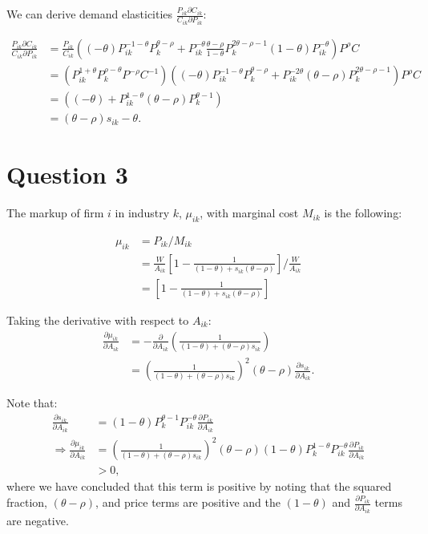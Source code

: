\documentclass[11pt]{article} %
\begin{document}
We can derive demand elasticities $\frac{P_{ik}\partial C_{ik}}{C_{ik}\partial P_{ik}}$:

\begin{align*}
\frac{P_{ik}\partial C_{ik}}{C_{ik}\partial P_{ik}} &= \frac{P_{ik}}{C_{ik}}\left( (-\theta)P_{ik}^{-1-\theta}P_{k}^{\theta - \rho} + P_{ik}^{-\theta} \frac{ \theta-\rho}{1-\theta } P_{k}^{2\theta - \rho - 1}(1-\theta)P_{ik}^{-\theta}  \right) P^{\rho} C\\
&=\left(P_{ik}^{1+\theta} P_{k}^{\rho - \theta} P^{-\rho} C^{-1} \right)\left( (-\theta)P_{ik}^{-1-\theta}P_{k}^{\theta - \rho} + P_{ik}^{-2\theta} (\theta-\rho) P_{k}^{2\theta - \rho - 1}  \right) P^{\rho} C\\
&=\left( (-\theta) + P_{ik}^{1-\theta} (\theta-\rho) P_{k}^{\theta  - 1}  \right) \\
&= (\theta - \rho)s_{ik} - \theta.
\end{align*}

\section{Question 3}

The markup of firm $i$ in industry $k$, $\mu_{ik}$, with marginal cost $M_{ik}$  is the following:

\begin{align*}
\mu_{ik} &= P_{ik} / M_{ik}\\
&=  \frac{W}{A_{ik}}\left[ 1 - \frac{1}{(1-\theta) +  s_{ik} (\theta - \rho)} \right] / \frac{W}{A_{ik}}\\
&=  \left[1 - \frac{1}{(1-\theta) +  s_{ik} (\theta - \rho)}\right]
\end{align*}

Taking the derivative with respect to $A_{ik}$:
\begin{align*}
\frac{\partial \mu_{ik}}{\partial A_{ik}} &= -\frac{\partial }{\partial A_{ik}}\left( \frac{1}{(1-\theta)+(\theta - \rho)s_{ik}} \right)\\
&= \left( \frac{1}{(1-\theta)+(\theta - \rho)s_{ik}} \right)^{2}(\theta - \rho)\frac{\partial s_{ik}}{\partial A_{ik}}.
\end{align*}

Note that:
\begin{align*}
\frac{\partial s_{ik}}{\partial A_{ik}} &= (1-\theta)P_{k}^{\theta - 1}P_{ik}^{-\theta}\frac{\partial P_{ik}}{\partial A_{ik}}\\
\Rightarrow \frac{\partial \mu_{ik}}{\partial A_{ik}} &= \left( \frac{1}{(1-\theta)+(\theta - \rho)s_{ik}} \right)^{2}(\theta - \rho) (1-\theta)P_{k}^{1-\theta}P_{ik}^{-\theta}\frac{\partial P_{ik}}{\partial A_{ik}}\\
&>0,
\end{align*}
where we have concluded that this term is positive by noting that the squared fraction, $(\theta - \rho)$, and price terms are positive and the $(1-\theta)$ and $\frac{\partial P_{ik}}{\partial A_{ik}}$ terms are negative.
\end{document}
